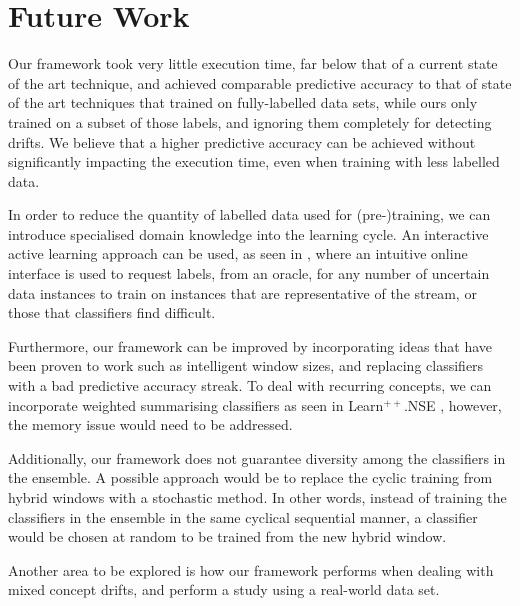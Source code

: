 
\section{Future Work}
Our framework took very little execution time, far below that of a current state of the art technique, and achieved comparable predictive accuracy to that of state of the art techniques that trained on fully-labelled data sets, while ours only trained on a subset of those labels, and ignoring them completely for detecting drifts. We believe that a higher predictive accuracy can be achieved without significantly impacting the execution time, even when training with less labelled data.

In order to reduce the quantity of labelled data used for (pre-)training, we can introduce specialised domain knowledge into the learning cycle. An interactive active learning approach can be used, as seen in \cite{floyd2017activetext}, where an intuitive online interface is used to request labels, from an oracle, for any number of uncertain data instances to train on instances that are representative of the stream, or those that classifiers find difficult.

Furthermore, our framework can be improved by incorporating ideas that have been proven to work such as intelligent window sizes, and replacing classifiers with a bad predictive accuracy streak. To deal with recurring concepts, we can incorporate weighted summarising classifiers as seen in Learn$^{++}$.NSE \cite{elwell2011incremental}, however, the memory issue would need to be addressed.

Additionally, our framework does not guarantee diversity among the classifiers in the ensemble. A possible approach would be to replace the cyclic training from hybrid windows with a stochastic method. In other words, instead of training the classifiers in the ensemble in the same cyclical sequential manner, a classifier would be chosen at random to be trained from the new hybrid window.

Another area to be explored is how our framework performs when dealing with mixed concept drifts, and perform a study using a real-world data set.
